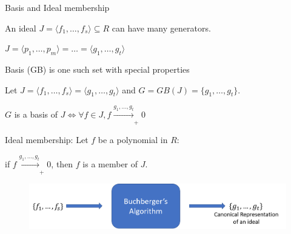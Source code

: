 \begin{frame}{\large \Grobner Basis and Ideal membership}
\bi
	\item An ideal $J = \langle f_1,\dots,f_s\rangle \subseteq R$ can have many generators. 
	\bi
		\item $J = \langle p_1,\dots,p_m\rangle = \dots = \langle g_1,\dots,g_t\rangle$
		\item \Grobner Basis (GB) is one such set with special properties
	\ei
	
	\vspace{0.1in}
	\item Let $J =  \langle f_1,\dots,f_s\rangle = \langle g_1,\dots,g_t\rangle$
	and $G = GB(J) = \{g_1,\dots,g_t \}$.
	\bi
	\item $G$ is a \Grobner basis of $J \iff \forall f \in J, f \xrightarrow[]{g_1,\dots,g_t}_+ 0$ 
	\item Ideal membership: Let $f$ be a polynomial in $R$:
	\bi
		\item if $f \xrightarrow[]{g_1,\dots,g_t}_+ 0$, then $f$ is a member of $J$. 
	\ei
	\ei
\ei
\begin{figure}
\centering
\includegraphics[scale=0.39]{GB.png}
\end{figure}
\end{frame}




